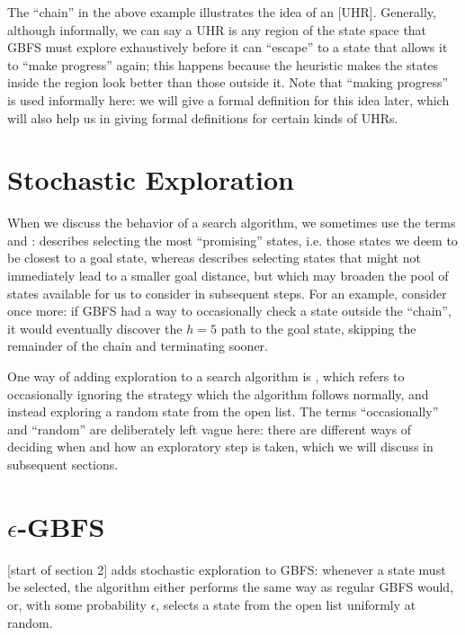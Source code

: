 The ``chain'' in the above example illustrates the idea of an [UHR]. Generally, although informally, we can say a UHR is any region of the state space that GBFS must explore exhaustively before it can ``escape'' to a state that allows it to ``make progress'' again; this happens because the heuristic makes the states inside the region look better than those outside it. Note that ``making progress'' is used informally here: we will give a formal definition for this idea later, which will also help us in giving formal definitions for certain kinds of UHRs.

\section{Stochastic Exploration}

When we discuss the behavior of a search algorithm, we sometimes use the terms  and :  describes selecting the most ``promising'' states, i.e. those states we deem to be closest to a goal state, whereas  describes selecting states that might not immediately lead to a smaller goal distance, but which may broaden the pool of states available for us to consider in subsequent steps. For an example, consider  once more: if GBFS had a way to occasionally check a state outside the ``chain'', it would eventually discover the $h=5$ path to the goal state, skipping the remainder of the chain and terminating sooner.

One way of adding exploration to a search algorithm is , which refers to occasionally ignoring the strategy which the algorithm follows normally, and instead exploring a random state from the open list. The terms ``occasionally'' and ``random'' are deliberately left vague here: there are different ways of deciding when and how an exploratory step is taken, which we will discuss in subsequent sections.

\section{$\epsilon$-GBFS}

 [start of section 2] adds stochastic exploration to GBFS: whenever a state must be selected, the algorithm either performs the same way as regular GBFS would, or, with some probability $\epsilon$, selects a state from the open list uniformly at random.

